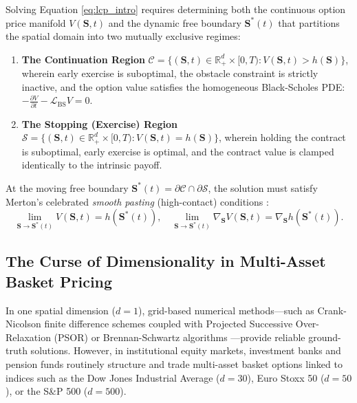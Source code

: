 \documentclass[11pt,a4paper]{article}
\begin{document}
Solving Equation \eqref{eq:lcp_intro} requires determining both the continuous option price manifold $V(\mathbf{S}, t)$ and the dynamic free boundary $\mathbf{S}^*(t)$ that partitions the spatial domain into two mutually exclusive regimes:
\begin{enumerate}[label=(\roman*)]
    \item \textbf{The Continuation Region} $\mathcal{C} = \{(\mathbf{S}, t) \in \mathbb{R}_+^d \times [0, T) : V(\mathbf{S}, t) > h(\mathbf{S})\}$, wherein early exercise is suboptimal, the obstacle constraint is strictly inactive, and the option value satisfies the homogeneous Black-Scholes PDE: $-\frac{\partial V}{\partial t} - \mathcal{L}_{\text{BS}} V = 0$.
    \item \textbf{The Stopping (Exercise) Region} $\mathcal{S} = \{(\mathbf{S}, t) \in \mathbb{R}_+^d \times [0, T) : V(\mathbf{S}, t) = h(\mathbf{S})\}$, wherein holding the contract is suboptimal, early exercise is optimal, and the contract value is clamped identically to the intrinsic payoff.
\end{enumerate}
At the moving free boundary $\mathbf{S}^*(t) = \partial \mathcal{C} \cap \partial \mathcal{S}$, the solution must satisfy Merton's celebrated \textit{smooth pasting} (high-contact) conditions \cite{merton1973theory}:
\begin{equation}
\label{eq:smooth_pasting_intro}
\lim_{\mathbf{S} \to \mathbf{S}^*(t)} V(\mathbf{S}, t) = h(\mathbf{S}^*(t)), \quad \lim_{\mathbf{S} \to \mathbf{S}^*(t)} \nabla_{\mathbf{S}} V(\mathbf{S}, t) = \nabla_{\mathbf{S}} h(\mathbf{S}^*(t)).
\end{equation}

\subsection{The Curse of Dimensionality in Multi-Asset Basket Pricing}
In one spatial dimension ($d=1$), grid-based numerical methods—such as Crank-Nicolson finite difference schemes coupled with Projected Successive Over-Relaxation (PSOR) \cite{cryer1971solution} or Brennan-Schwartz algorithms \cite{brennan1977valuation}—provide reliable ground-truth solutions. However, in institutional equity markets, investment banks and pension funds routinely structure and trade multi-asset basket options linked to indices such as the Dow Jones Industrial Average ($d=30$), Euro Stoxx 50 ($d=50$), or the S\&P 500 ($d=500$). 
\end{document}
